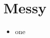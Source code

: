 \documentclass{article}
\begin{document}
\section{Messy}
\begin{itemize}
\item one
\end{itemize}
\end{document}
